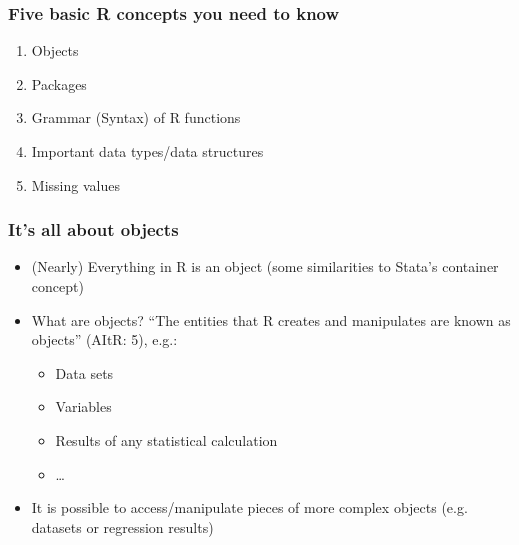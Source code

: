 \documentclass[bigger]{beamer}
\begin{document}
\begin{frame}
\frametitle{Five basic R concepts you need to know}
\label{sec-1-1-6}

\begin{enumerate}
\item Objects
\item Packages
\item Grammar (Syntax) of R functions
\item Important data types/data structures
\item Missing values
\end{enumerate}
\end{frame}
\begin{frame}
\frametitle{It's all about objects}
\label{sec-1-1-7}

\begin{itemize}
\item (Nearly) Everything in R is an object (some similarities to Stata's
      container concept)
\item What are objects? \enquote{The entities that R creates and manipulates are known as objects} (AItR: 5), e.g.:
\begin{itemize}
\item Data sets
\item Variables
\item Results of any statistical calculation
\item \ldots
\end{itemize}
\item It is possible to access/manipulate pieces of more complex objects (e.g. datasets or regression results)
\end{itemize}
\end{frame}
\end{document}
